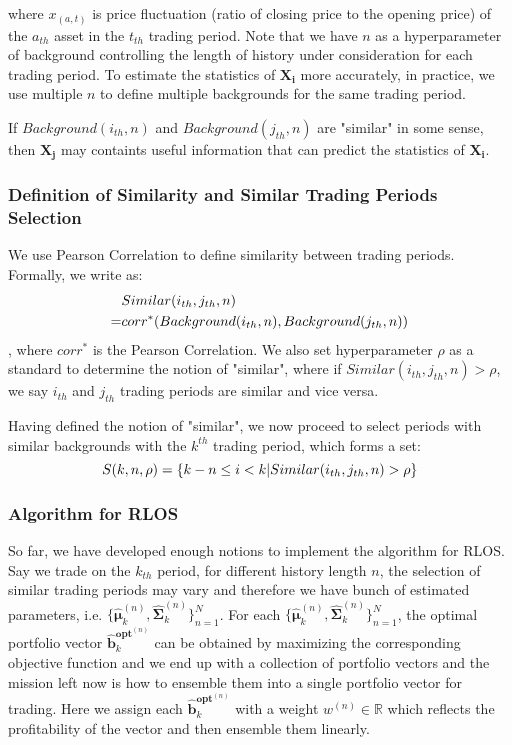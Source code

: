 \documentclass{gapd}
\begin{document}
where $x_{(a,t)}$ is price fluctuation (ratio of closing price to the opening price) of the $a_{th}$ asset in the $t_{th}$ trading period. Note that we have $n$ as a hyperparameter of background controlling the length of history under consideration for each trading period. To estimate the statistics of $\mathbf{X_i}$ more accurately, in practice, we use multiple $n$ to define multiple backgrounds for the same trading period.

If $Background(i_{th},n)$ and $Background(j_{th},n)$ are "similar" in some sense, then $\mathbf{X_j}$ may containts useful information that can predict the statistics of $\mathbf{X_i}$.

\subsubsection{Definition of Similarity and Similar Trading Periods Selection}

We use Pearson Correlation to define similarity between trading periods. Formally, we write as:
\begin{equation}
\begin{aligned}
&Similar(i_{th},j_{th},n)\\
=&corr^*(Background(i_{th},n),Background(j_{th},n)) \notag
\end{aligned}
\end{equation}
, where $corr^*$ is the Pearson Correlation. We also set hyperparameter $\rho$ as a standard to determine the notion of "similar", where if $Similar(i_{th},j_{th},n) > \rho$, we say $i_{th}$ and $j_{th}$ trading periods are similar and vice versa.

Having defined the notion of "similar", we now proceed to select periods with similar backgrounds with the $k^{th}$ trading period, which forms a set: 
\begin{equation}
S(k,n,\rho)=\{k-n \le i < k | Similar(i_{th},j_{th},n) > \rho\} \notag
\end{equation}

\subsubsection{Algorithm for RLOS}

So far, we have developed enough notions to implement the algorithm for RLOS. Say we trade on the $k_{th}$ period, for different history length $n$, the selection of similar trading periods may vary and therefore we have bunch of estimated parameters, i.e. $\{{\hat{\boldsymbol{\mu}}}_k^{(n)},{\hat{\boldsymbol{\Sigma}}}_k^{(n)}\}^N_{n=1}$. For each $\{{\hat{\boldsymbol{\mu}}}_k^{(n)},{\hat{\boldsymbol{\Sigma}}}_k^{(n)}\}^N_{n=1}$, the optimal portfolio vector $\mathbf{\hat{b}}_{k}^{\mathbf{opt}^{(n)}}$ can be obtained by maximizing the corresponding objective function and we end up with a collection of portfolio vectors and the mission left now is how to ensemble them into a single portfolio vector for trading. Here we assign each $\mathbf{\hat{b}}_{k}^{\mathbf{opt}^{(n)}}$ with a weight $w^{(n)} \in \mathbb{R}$ which reflects the profitability of the vector and then ensemble them linearly.
\end{document}

